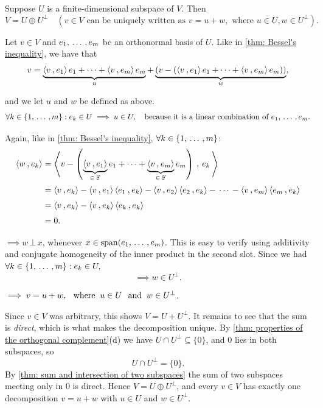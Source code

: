 \begin{thm}
  \label{thm: direct sum of a subspace and its orthogonal complement}
  Suppose $U$ is a finite-dimensional subspace of $V$. Then
  \[
    V = U \oplus U^{\bot} \quad (v \in V \text{ can be uniquely written as } v=u+w, \text{ where } u\in U, w\in U^{\bot}).
  \]
\end{thm}
\begin{prf}
  Let $v \in V$ and $e_1, {\, \ldots \,\,}, e_m$ be an orthonormal basis of $U$. Like in \ref{thm: Bessel's inequality}, we have that
  \[
    v= \underbrace{\ip{v}{e_1}e_1 + \cdots + \ip{v}{e_m} e_m}_u + \underbrace{\left(v - (\ip{v}{e_1}e_1 + \cdots + \ip{v}{e_m} e_m)\right)}_w,
  \]

  and we let $u$ and $w$ be defined as above.
  \[
    \forall k \in \{1, {\, \ldots \,\,}, m\}: e_k \in U \implies u \in U, \quad \text{because it is a linear combination of } e_1, {\, \ldots \,\,}, e_m.
  \]

  Again, like in \ref{thm: Bessel's inequality}, $\forall k \in \{1, {\, \ldots \,\,}, m\}$:
  \begin{equation}
    \begin{aligned}
      \ip{w}{e_k}
      &=\ip{v - \left(\underbrace{\ip{v}{e_1}}_{\in \; \myF}e_1 + \cdots + \underbrace{\ip{v}{e_m}}_{\in \; \myF} e_m\right)}{ \,e_k \,} \\
      &=\ip{v}{e_k} - \ip{v}{e_1}\ip{e_1}{e_k} - \ip{v}{e_2}\ip{e_2}{e_k} - \, \cdots \, - \ip{v}{e_m}\ip{e_m}{e_k} \\
      &=\ip{v}{e_k} - \ip{v}{e_k}\ip{e_k}{e_k} \\
      &=0.
    \end{aligned}
  \end{equation}

  $\implies w \, \bot \, x$, whenever $x \in \operatorname{span} (e_1, {\, \ldots \,\,}, e_m)$. This is easy to verify using additivity and conjugate homogeneity of the inner product in the second slot. Since we had $\forall k \in \{1, {\, \ldots \,\,}, m \}: e_k \in U,$
  \[
    \implies w \in U^{\bot}.
  \]

  $\implies v = u + w, \;\;\, \text{where}\;\; u \in U \;\;\, \text{and}\;\; w \in U^{\bot}$.

  Since $v \in V$ was arbitrary, this shows $V = U + U^{\bot}$. It remains to see that the sum is \emph{direct}, which is what makes the decomposition unique. By \ref{thm: properties of the orthogonal complement}(d) we have $U \cap U^{\bot} \subseteq \{0\}$, and $0$ lies in both subspaces, so
  \begin{equation}
    U \cap U^{\bot} = \{0\}.
  \end{equation}
  By \ref{thm: sum and intersection of two subspaces} the sum of two subspaces meeting only in $0$ is direct. Hence $V = U \oplus U^{\bot}$, and every $v \in V$ has exactly one decomposition $v = u + w$ with $u \in U$ and $w \in U^{\bot}$.
\end{prf}

